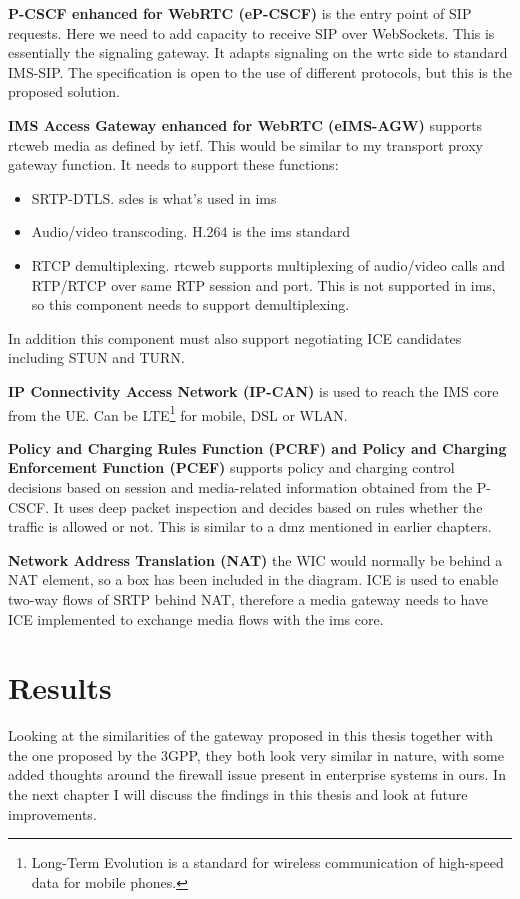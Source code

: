\textbf{P-CSCF enhanced for WebRTC (eP-CSCF)}
is the entry point of SIP requests. Here we need to add capacity to receive SIP over WebSockets. This is essentially the signaling gateway. It adapts signaling on the \gls{wrtc} side to standard IMS-SIP. The specification is open to the use of different protocols, but this is the proposed solution.

\textbf{IMS Access Gateway enhanced for WebRTC (eIMS-AGW)}
supports \gls{rtcweb} media as defined by \gls{ietf}. This would be similar to my transport proxy gateway function. It needs to support these functions:
\begin{itemize}
\item{SRTP-DTLS. \gls{sdes} is what's used in \gls{ims}}
\item{Audio/video transcoding. H.264 is the \gls{ims} standard}
\item{RTCP demultiplexing. \gls{rtcweb} supports multiplexing of audio/video calls and RTP/RTCP over same RTP session and port. This is not supported in \gls{ims}, so this component needs to support demultiplexing.}
\end{itemize}

In addition this component must also support negotiating ICE candidates including STUN and TURN.

\textbf{IP Connectivity Access Network (IP-CAN)}
is used to reach the IMS core from the UE. Can be LTE\footnote{Long-Term Evolution is a standard for wireless communication of high-speed data for mobile phones.} for mobile, DSL or WLAN.

\textbf{Policy and Charging Rules Function (PCRF) and Policy and Charging Enforcement Function (PCEF)}
supports policy and charging control decisions based on session and media-related information obtained from the P-CSCF. It uses deep packet inspection and decides based on rules whether the traffic is allowed or not. This is similar to a \gls{dmz} mentioned in earlier chapters.

\textbf{Network Address Translation (NAT)}
the WIC would normally be behind a NAT element, so a box has been included in the diagram. ICE is used to enable two-way flows of SRTP behind NAT, therefore a media gateway needs to have ICE implemented to exchange media flows with the \gls{ims} core.

\section{Results}
Looking at the similarities of the gateway proposed in this thesis together with the one proposed by the 3GPP, they both look very similar in nature, with some added thoughts around the firewall issue present in enterprise systems in ours. In the next chapter I will discuss the findings in this thesis and look at future improvements.